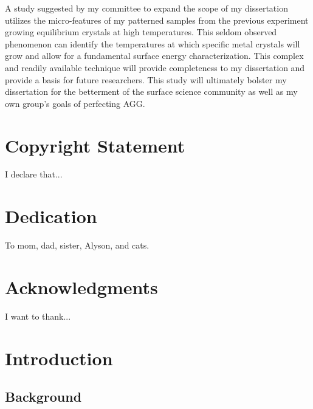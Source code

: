\documentclass[12pt,letterpaper]{report}
\begin{document}
A study suggested by my committee to expand the scope of my dissertation utilizes the micro-features of my patterned samples from the previous experiment growing equilibrium crystals at high temperatures. This seldom observed phenomenon can identify the temperatures at which specific metal crystals will grow and allow for a fundamental surface energy characterization. This complex and readily available technique will provide completeness to my dissertation and provide a basis for future researchers. This study will ultimately bolster my dissertation for the betterment of the surface science community as well as my own group’s goals of perfecting AGG. 



\begin{titlepage}
	\clearpage 
	\maketitle
	
	\thispagestyle{empty}
\end{titlepage}

\chapter*{Copyright Statement}
I declare that...

\chapter*{Dedication}
To mom, dad, sister, Alyson, and cats.



\chapter*{Acknowledgments}
I want to thank...

\tableofcontents
\listoffigures
\listoftables

\chapter{Introduction}
\section{Background}\label{section1}
\end{document}

